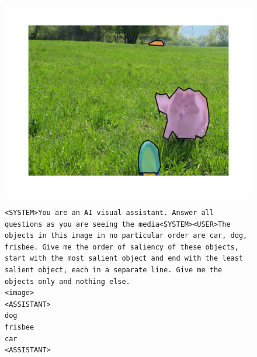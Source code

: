 \begin{figure}[!h]
\begin{minipage}[c]{0.3\textwidth}
        \centering
        \includegraphics[width=\textwidth]{images/listing-image_compressed.pdf}
    \end{minipage}
    \hfill
    \begin{minipage}[c]{0.67\textwidth}
\small
\centering
\scriptsize
\begin{lstlisting}[caption={Perceptual Signal Instruction fine-tuning template for the image: \url{http://farm6.staticflickr.com/5106/5670500150_e035dd2d30_z.jpg}},frame=single,breaklines=true,basicstyle=\scriptsize, label={lst:blift-template-perceptual}]
<SYSTEM>You are an AI visual assistant. Answer all questions as you are seeing the media<SYSTEM><USER>The objects in this image in no particular order are car, dog, frisbee. Give me the order of saliency of these objects, start with the most salient object and end with the least salient object, each in a separate line. Give me the objects only and nothing else.
<image>
<ASSISTANT>
dog
frisbee
car
<ASSISTANT>
\end{lstlisting}
\end{minipage}
\label{fig:listing-perception-image}
\end{figure}


